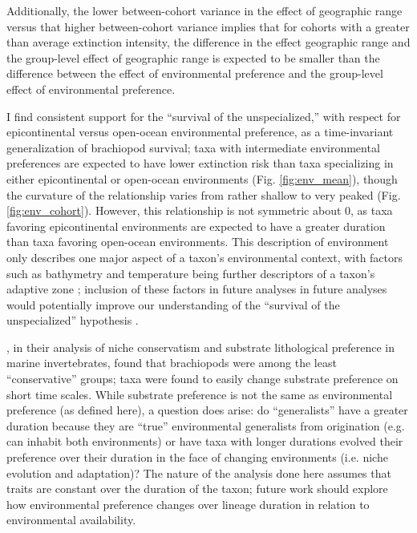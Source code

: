 \documentclass{article}
\begin{document}
Additionally, the lower between-cohort variance in the effect of geographic range versus that higher between-cohort variance implies that for cohorts with a greater than average extinction intensity, the difference in the effect geographic range and the group-level effect of geographic range is expected to be smaller than the difference between the effect of environmental preference and the group-level effect of environmental preference.

I find consistent support for the ``survival of the unspecialized,'' with respect for epicontinental versus open-ocean environmental preference, as a time-invariant generalization of brachiopod survival; taxa with intermediate environmental preferences are expected to have lower extinction risk than taxa specializing in either epicontinental or open-ocean environments (Fig. \ref{fig:env_mean}), though the curvature of the relationship varies from rather shallow to very peaked (Fig. \ref{fig:env_cohort}). However, this relationship is not symmetric about 0, as taxa favoring epicontinental environments are expected to have a greater duration than taxa favoring open-ocean environments. This description of environment only describes one major aspect of a taxon's environmental context, with factors such as bathymetry and temperature being further descriptors of a taxon's adaptive zone \citep{Nurnberg2013a,Harnik2013,Harnik2011,Heim2011}; inclusion of these factors in future analyses in future analyses would potentially improve our understanding of the ``survival of the unspecialized'' hypothesis \citep{Simpson1944}.

\citet{Hopkins2014a}, in their analysis of niche conservatism and substrate lithological preference in marine invertebrates, found that brachiopods were among the least ``conservative'' groups; taxa were found to easily change substrate preference on short time scales. While substrate preference is not the same as environmental preference (as defined here), a question does arise: do ``generalists'' have a greater duration because they are ``true'' environmental generalists from origination (e.g. can inhabit both environments) or have taxa with longer durations evolved their preference over their duration in the face of changing environments (i.e. niche evolution and adaptation)? The nature of the analysis done here assumes that traits are constant over the duration of the taxon; future work should explore how environmental preference changes over lineage duration in relation to environmental availability.
\end{document}
